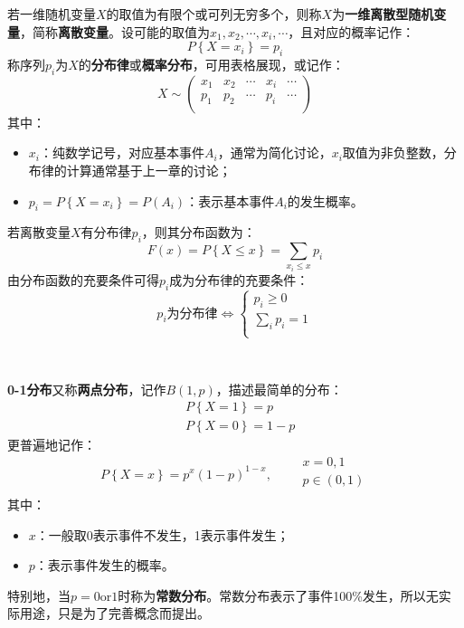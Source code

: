 \begin{definition}[一维离散型随机变量]
若一维随机变量$X$的取值为有限个或可列无穷多个，则称$X$为{\bf 一维离散型随机变量}，简称{\bf 离散变量}。设可能的取值为$x_1,x_2,\cdots ,x_i,\cdots $，且对应的概率记作：
\[
P\left\{ X=x_i \right\} =p_i
\]
称序列$p_i$为$X$的{\bf 分布律}或{\bf 概率分布}，可用表格展现，或记作：
\[
X\sim \left( \begin{matrix}
	x_1&		x_2&		\cdots&		x_i&		\cdots\\
	p_1&		p_2&		\cdots&		p_i&		\cdots\\
\end{matrix} \right)
\]
其中：
\begin{itemize}
    \item $x_i$：纯数学记号，对应基本事件$A_i$，通常为简化讨论，$x_i$取值为非负整数，分布律的计算通常基于上一章的讨论；
    \item $p_i=P\left\{ X=x_i \right\} =P\left( A_i \right) $：表示基本事件$A_i$的发生概率。
\end{itemize}
\end{definition}

若离散变量$X$有分布律$p_i$，则其分布函数为：
\[
F\left( x \right) =P\left\{ X\leqslant x \right\} =\sum_{x_i\leqslant x}{p_i}
\]
由分布函数的充要条件可得$p_i$成为分布律的充要条件：
\[
p_i\text{为分布律}\Leftrightarrow \begin{cases}
	p_i\geqslant 0\\
	\sum_i{p_i}=1\\
\end{cases}
\]

~

{\bf 0-1分布}又称{\bf 两点分布}，记作$B\left( 1,p \right) $，描述最简单的分布：
\begin{align*}
&P\left\{ X=1 \right\} =p\\
&P\left\{ X=0 \right\} =1-p
\end{align*}
更普遍地记作：
\[
P\left\{ X=x \right\} =p^x\left( 1-p \right) ^{1-x},\qquad \begin{array}{l}
	x=0,1\\
	p\in \left( 0,1 \right)\\
\end{array}
\]
其中：
\begin{itemize}
    \item $x$：一般取0表示事件不发生，1表示事件发生；
    \item $p$：表示事件发生的概率。
\end{itemize}
特别地，当$p=0\mathrm{or}1$时称为{\bf 常数分布}。常数分布表示了事件100\%发生，所以无实际用途，只是为了完善概念而提出。

